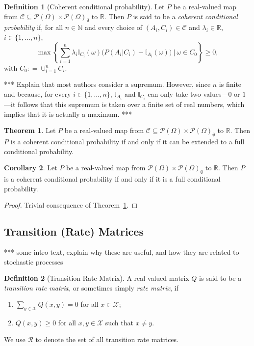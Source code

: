 \documentclass[10pt]{paper}
\theoremstyle{definition}
\newtheorem{theorem}{Theorem}
\newtheorem{corollary}[theorem]{Corollary}
\newtheorem{definition}{Definition}
\newcommand{\reals}{\mathbb{R}}
\newcommand{\states}{\mathcal{X}}
\newcommand{\paths}{\Omega}
\newcommand{\power}{\mathcal{P}(\paths)}
\newcommand{\nonemptypower}{\power_{\emptyset}}
\newcommand{\ind}[1]{\mathbb{I}_{#1}}
\newcommand{\coloneqq}{:\!=}
\begin{document}
\begin{definition}[Coherent conditional probability]\label{def:coherence}
Let $P$ be a real-valued map from $\mathcal{C}\subseteq\power\times\nonemptypower$ to $\reals$. Then $P$ is said to be a \emph{coherent conditional probability} if, for all $n\in\mathbb{N}$ and every choice of $(A_i,C_i)\in\mathcal{C}$ and $\lambda_i\in\reals$, $i\in\{1,\dots,n\}$,
\begin{equation*}
\max\left\{\sum_{i=1}^n\lambda_i\ind{C_i}(\omega)\bigl(P(A_i\vert C_i)-\ind{A_i}(\omega)\bigr)~\Bigg\vert~\omega\in C_0\right\}\geq0,
\end{equation*}
with $C_0\coloneqq\cup_{i=1}^nC_i$.
\end{definition}

*** Explain that most authors consider a supremum. However, since $n$ is finite and because, for every $i\in\{1,\dots,n\}$, $\ind{A_i}$ and $\ind{C_i}$ can only take two values---$0$ or $1$---it follows that this supremum is taken over a finite set of real numbers, which implies that it is actually a maximum. ***

\begin{theorem}\label{theo:coherentextendable}
Let $P$ be a real-valued map from $\mathcal{C}\subseteq\power\times\nonemptypower$ to $\reals$. Then $P$ is a coherent conditional probability if and only if it can be extended to a full conditional probability.
\end{theorem}

\begin{corollary}\label{corol:fullcoherent}
Let $P$ be a real-valued map from $\power\times\nonemptypower$ to $\reals$. Then $P$ is a coherent conditional probability if and only if it is a full conditional probability.
\end{corollary}
\begin{proof}
Trivial consequence of Theorem~\ref{theo:coherentextendable}.
\end{proof}

\subsection{Transition (Rate) Matrices}\label{sec:trans_rate_matrices}

*** some intro text, explain why these are useful, and how they are related to stochastic processes

\begin{definition}[Transition Rate Matrix]\label{def:rate_matrix}
A real-valued matrix $Q$ is said to be a \emph{transition rate matrix}, or sometimes simply \emph{rate matrix}, if

\vspace{5pt}
\begin{enumerate}[label=R\arabic*:]
\item
$\sum_{y\in\states}Q(x,y)=0$ for all $x\in\states$;
\item
$Q(x,y)\geq0$ for all $x,y\in\states$ such that $x\neq y$.
\end{enumerate}
\vspace{5pt}
\noindent
We use $\mathcal{R}$ to denote the set of all transition rate matrices. 
\end{definition}
\end{document}
